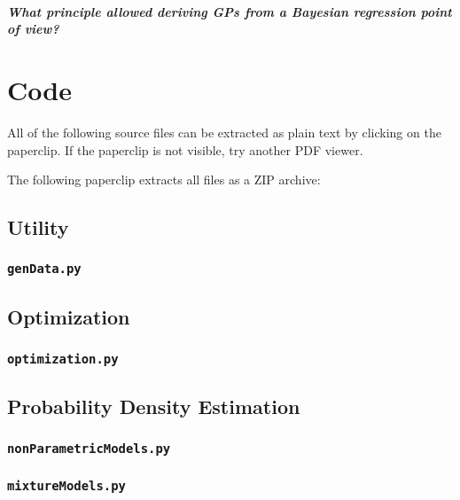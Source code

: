 		\paragraph{What principle allowed deriving GPs from a Bayesian regression point of view?}


\chapter{Code}
	All of the following source files can be extracted as plain text by clicking on the paperclip. If the paperclip is not visible, try another PDF viewer.

	The following paperclip extracts all files as a ZIP archive: 

	\section{Utility}
		\subsection{\texttt{genData.py}}

	\section{Optimization}
		\subsection{\texttt{optimization.py}}

	\section{Probability Density Estimation}
		\subsection{\texttt{nonParametricModels.py}}

		\subsection{\texttt{mixtureModels.py}}

